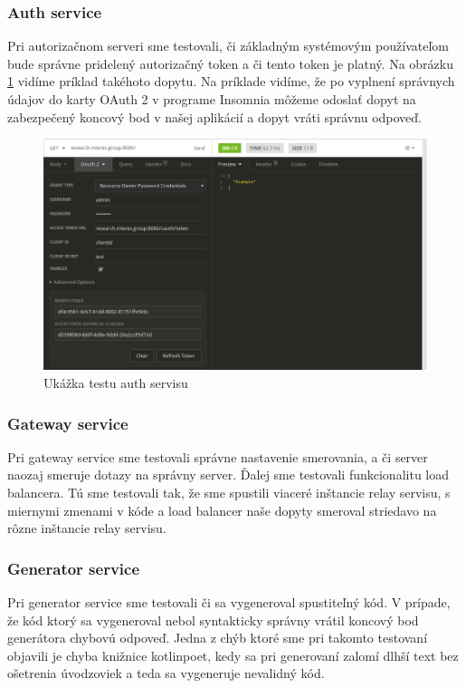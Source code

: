 \subsubsection{Auth service}
Pri autorizačnom serveri sme testovali, či základným systémovým používateľom bude správne pridelený autorizačný token a či tento token je platný. Na obrázku \ref{insomnia_oauth} vidíme príklad takéhoto dopytu. Na príklade vidíme, že po vyplnení správnych údajov do karty OAuth 2 v programe Insomnia môžeme odoslať dopyt na zabezpečený koncový bod v našej aplikácií a dopyt vráti správnu odpoveď.
\begin{figure}[!htbp]
	\centering
	\includegraphics[width=16cm]{img/insomnia_oauth.png}
	\caption{Ukážka testu auth servisu}
	\label{insomnia_oauth}
\end{figure}

\subsubsection{Gateway service}
Pri gateway service sme testovali správne nastavenie smerovania, a či server naozaj smeruje dotazy na správny server. Ďalej sme testovali funkcionalitu load balancera. Tú sme testovali tak, že sme spustili viaceré inštancie relay servisu, s miernymi zmenami v kóde a load balancer naše dopyty smeroval striedavo na rôzne inštancie relay servisu.

\subsubsection{Generator service}
Pri generator service sme testovali či sa vygeneroval spustiteľný kód. V prípade, že kód ktorý sa vygeneroval nebol syntakticky správny vrátil koncový bod generátora chybovú odpoveď. Jedna z chýb ktoré sme pri takomto testovaní objavili je chyba knižnice kotlinpoet, kedy sa pri generovaní zalomí dlhší text bez ošetrenia úvodzoviek a teda sa vygeneruje nevalidný kód.

